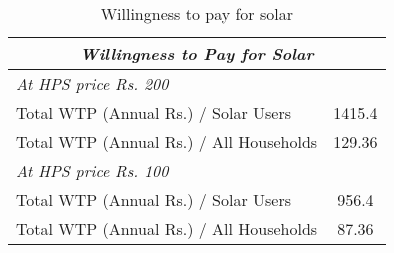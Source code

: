 \begin{table}[htbp]\centering
\def\sym#1{\ifmmode^{#1}\else\(^{#1}\)\fi}
\caption{Willingness to pay for solar\label {tab1}}
\begin{tabular}{l*{1}{c}}
\toprule
 \multicolumn{2}{c}{\textit{Willingness to Pay for Solar}}\\
\midrule
\multicolumn{2}{l}{\textit{At HPS price Rs. 200}}\\
Total WTP (Annual Rs.) / Solar Users&      1415.4\\
Total WTP (Annual Rs.) / All Households&       129.36\\
\multicolumn{2}{l}{\textit{At HPS price Rs. 100}} \\
Total WTP (Annual Rs.) / Solar Users& 956.4 \\
Total WTP (Annual Rs.) / All Households & 87.36\\
\bottomrule
\end{tabular}
\end{table}
